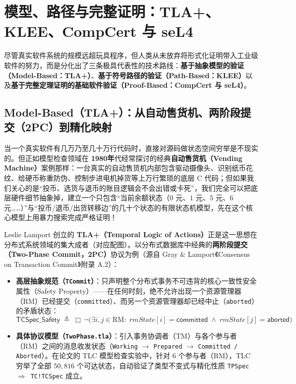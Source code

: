 \documentclass[a4paper]{article}
\begin{document}
\section{模型、路径与完整证明：TLA+、KLEE、CompCert 与 seL4}

尽管真实软件系统的规模远超玩具程序，但人类从未放弃将形式化证明带入工业级软件的努力，而是分化出了三条极具代表性的技术路线：\textbf{基于抽象模型的验证（Model-Based：TLA+）}、\textbf{基于符号路径的验证（Path-Based：KLEE）}以及\textbf{基于完整定理证明的基础软件验证（Proof-Based：CompCert 与 seL4）}。

\subsection{Model-Based（TLA+）：从自动售货机、两阶段提交（2PC）到精化映射}

当一个真实软件有几万乃至几十万行代码时，直接对源码做状态空间穷举是不现实的。但正如模型检查领域在 \textbf{1980年}代经常探讨的经典\textbf{自动售货机（Vending Machine）}案例那样：一台真实的自动售货机内部包含驱动摄像头、识别纸币花纹、给硬币称重防伪、控制步进电机掉货等上万行繁琐的底层 C 代码；但如果我们关心的是“投币、选货与退币的账目逻辑会不会出错或卡死”，我们完全可以把底层硬件细节抽象掉，建立一个只包含“当前余额状态（$0$ 元、$1$ 元、$5$ 元、$6$ 元……）”与“投币/退币/出货转移边”的几十个状态的有限状态机模型，先在这个核心模型上用暴力搜索完成严格证明！

Leslie Lamport 创立的 \textbf{TLA+（Temporal Logic of Actions）}正是这一思想在分布式系统领域的集大成者（对应配图）。以分布式数据库中经典的\textbf{两阶段提交（Two-Phase Commit，2PC）}协议为例（源自 Gray \& Lamport《Consensus on Transaction Commit》附录 A.2）：
\begin{itemize}
    \item \textbf{高层抽象规范（\texttt{TCommit}）}：只声明整个分布式事务不可违背的核心一致性安全属性（Safety Property）——在任何时刻，绝不允许出现一个资源管理器（RM）已经提交（\texttt{committed}）、而另一个资源管理器却已经中止（\texttt{aborted}）的矛盾状态：
    \begin{equation}
    \mathsf{TCSpec\_Safety} \;\triangleq\; \Box\,\neg\Big(\exists i, j \in \mathrm{RM}:\; \mathit{rmState}[i] = \mathsf{committed} \;\land\; \mathit{rmState}[j] = \mathsf{aborted}\Big)
    \label{eq:2pc_safety_spec}
    \end{equation}
    \item \textbf{具体协议模型（\texttt{TwoPhase.tla}）}：引入事务协调者（TM）与各个参与者（RM）之间的消息收发状态（\texttt{Working} $\to$ \texttt{Prepared} $\to$ \texttt{Committed / Aborted}）。在论文的 TLC 模型检查实验中，针对 $6$ 个参与者（RM），TLC 穷举了全部 $50,816$ 个可达状态，自动验证了类型不变式与精化性质 \texttt{TPSpec $\Rightarrow$ TC!TCSpec} 成立。
\end{itemize}
\end{document}
